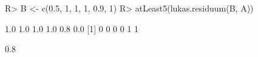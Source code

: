 \begin{Schunk}
% --begin: "quant3"
\begin{Sinput}
R> B <- c(0.5, 1, 1, 1, 0.9, 1)
R> atLeast5(lukas.residuum(B, A))
\end{Sinput}
\begin{Soutput}
[1] 1.0 1.0 1.0 1.0 0.8 0.0
[1] 0 0 0 0 1 1
\end{Soutput}
\begin{Soutput}
[1] 0.8
\end{Soutput}
%
% --end: "quant3"
\end{Schunk}
